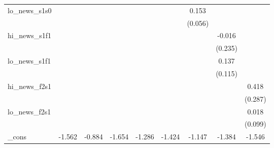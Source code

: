 {\begin{tabular}{l*{8}{c}}
\addlinespace
lo\_news\_s1s0&                     &                     &                     &                     &                     &       0.153\sym{***}&                     &                     \\
            &                     &                     &                     &                     &                     &     (0.056)         &                     &                     \\
\addlinespace
hi\_news\_s1f1&                     &                     &                     &                     &                     &                     &      -0.016         &                     \\
            &                     &                     &                     &                     &                     &                     &     (0.235)         &                     \\
\addlinespace
lo\_news\_s1f1&                     &                     &                     &                     &                     &                     &       0.137         &                     \\
            &                     &                     &                     &                     &                     &                     &     (0.115)         &                     \\
\addlinespace
hi\_news\_f2s1&                     &                     &                     &                     &                     &                     &                     &       0.418         \\
            &                     &                     &                     &                     &                     &                     &                     &     (0.287)         \\
\addlinespace
lo\_news\_f2s1&                     &                     &                     &                     &                     &                     &                     &       0.018         \\
            &                     &                     &                     &                     &                     &                     &                     &     (0.099)         \\
\addlinespace
\_cons      &      -1.562\sym{***}&      -0.884\sym{*}  &      -1.654\sym{***}&      -1.286\sym{***}&      -1.424\sym{***}&      -1.147\sym{***}&      -1.384\sym{***}&      -1.546\sym{***}\\

\end{tabular}}
